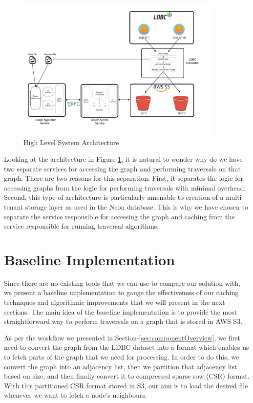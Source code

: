\begin{figure}[ht]
    \centering
    \includegraphics[width=0.9\textwidth]{figures/architecture.png}
    \caption{High Level System Architecture}
    \label{fig:sysArch}
\end{figure}

Looking at the architecture in Figure-\ref{fig:sysArch}, it is natural to wonder
why do we have two separate services for accessing the graph and performing
traversals on that graph. There are two reasons for this separation: First, it
separates the logic for accessing graphs from the logic for performing
traversals with minimal overhead; Second, this type of architecture is
particularly amenable to creation of a multi-tenant storage layer as used
in the Neon database\cite{neonPostgres}. This is why we have chosen to separate
the service responsible for accessing the graph and caching from the service
responsible for running traversal algorithms.

\section{Baseline Implementation}\label{sec:baseline}
Since there are no existing tools that we can use to compare our solution with,
we present a baseline implementation to gauge the effectiveness of our caching
techniques and algorithmic improvements that we will present in the next
sections. The main idea of the baseline implementation is to provide the most
straightforward way to perform traversals on a graph that is stored in AWS S3.

\medskip
As per the workflow we presented in Section-\ref{sec:componentOverview}, we
first need to convert the graph from the LDBC dataset into a format which
enables us to fetch parts of the graph that we need for processing. In order to
do this, we convert the graph into an adjacency list, then we partition that
adjacency list based on size, and then finally convert it to compressed sparse
row (CSR) format\cite{duff1984computer}. With this partitioned CSR format stored
in S3, our aim is to load the desired file whenever we want to fetch a node's
neighbours.

